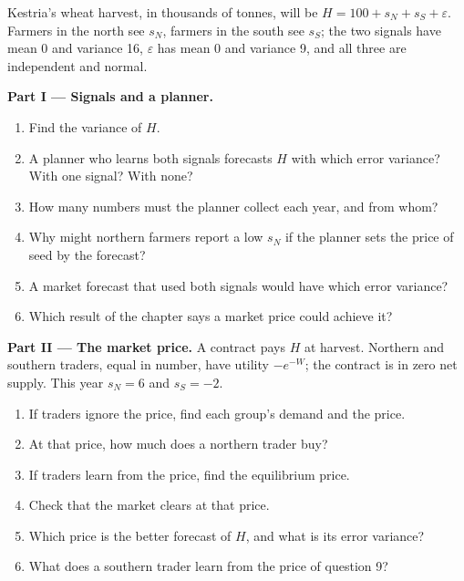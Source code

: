 \begin{problem}
\label{pb:b2:prices-as-information:1}
Kestria's wheat harvest, in thousands of tonnes, will be $H = 100 + s_N + s_S + \varepsilon$. Farmers in the
north see $s_N$, farmers in the south see $s_S$; the two signals have mean 0 and variance 16, $\varepsilon$
has mean 0 and variance 9, and all three are independent and normal.

\medskip
\noindent\textbf{Part I --- Signals and a planner.}
\begin{enumerate}
  \item Find the variance of $H$.
  \item A planner who learns both signals forecasts $H$ with which error variance? With one signal? With
        none?
  \item How many numbers must the planner collect each year, and from whom?
  \item Why might northern farmers report a low $s_N$ if the planner sets the price of seed by the
        forecast?
  \item A market forecast that used both signals would have which error variance?
  \item Which result of the chapter says a market price could achieve it?
\end{enumerate}

\medskip
\noindent\textbf{Part II --- The market price.} A contract pays $H$ at harvest. Northern and southern
traders, equal in number, have utility $-e^{-W}$; the contract is in zero net supply. This year $s_N = 6$ and
$s_S = -2$.
\begin{enumerate}[resume]
  \item If traders ignore the price, find each group's demand and the price.
  \item At that price, how much does a northern trader buy?
  \item If traders learn from the price, find the equilibrium price.
  \item Check that the market clears at that price.
  \item Which price is the better forecast of $H$, and what is its error variance?
  \item What does a southern trader learn from the price of question 9?
\end{enumerate}


\end{problem}
